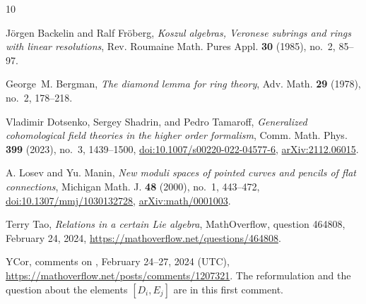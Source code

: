 \documentclass[11pt]{amsart}
\theoremstyle{definition}
\theoremstyle{remark}
\begin{document}
\providecommand{\bysame}{\leavevmode\hbox to3em{\hrulefill}\thinspace}
\begin{thebibliography}{10}

J\"orgen Backelin and Ralf Fr\"oberg, \emph{Koszul algebras, {V}eronese subrings and rings with linear resolutions}, Rev. Roumaine Math. Pures Appl. \textbf{30} (1985), no.~2, 85--97.

George~M. Bergman, \emph{The diamond lemma for ring theory}, Adv. Math. \textbf{29} (1978), no.~2, 178--218.

Vladimir Dotsenko, Sergey Shadrin, and Pedro Tamaroff, \emph{Generalized cohomological field theories in the higher order formalism}, Comm. Math. Phys. \textbf{399} (2023), no.~3, 1439--1500, \href{https://doi.org/10.1007/s00220-022-04577-6}{doi:10.1007/s00220-022-04577-6}, \href{https://arxiv.org/abs/2112.06015}{arXiv:2112.06015}.

A. Losev and Yu. Manin, \emph{New moduli spaces of pointed curves and pencils of flat connections}, Michigan Math. J. \textbf{48} (2000), no.~1, 443--472, \href{https://doi.org/10.1307/mmj/1030132728}{doi:10.1307/mmj/1030132728}, \href{https://arxiv.org/abs/math/0001003}{arXiv:math/0001003}.

Terry Tao, \emph{Relations in a certain {L}ie algebra}, MathOverflow, question 464808, February 24, 2024, \url{https://mathoverflow.net/questions/464808}.

YCor, comments on \cite{MO}, February 24--27, 2024 (UTC), \url{https://mathoverflow.net/posts/comments/1207321}. The reformulation and the question about the elements $[D_i,E_j]$ are in this first comment.

\end{thebibliography}
\end{document}
